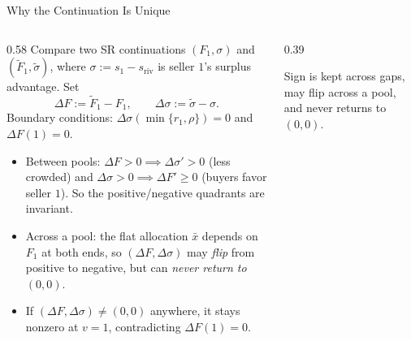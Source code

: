 \documentclass[11pt,aspectratio=169]{beamer}
\def\meditem{\smallskip\item}
\begin{document}
\begin{frame}{Why the Continuation Is Unique}
\begin{columns}[T]
\begin{column}{0.58\textwidth}
Compare two SR continuations $(F_1,\sigma)$ and $(\tilde F_1,\tilde\sigma)$, where $\sigma:=s_1-s_{\mathrm{riv}}$ is seller $1$'s surplus advantage. Set
\[
\Delta F := \tilde F_1 - F_1, \qquad \Delta\sigma := \tilde\sigma - \sigma.
\]
Boundary conditions: $\Delta\sigma(\min\{r_1,\rho\})=0$ and $\Delta F(1)=0$.
\begin{itemize}
\item \alert{Between pools}: $\Delta F>0 \implies \Delta\sigma'>0$ (less crowded) and $\Delta\sigma>0 \implies \Delta F'\ge 0$ (buyers favor seller $1$). So the positive/negative quadrants are invariant.
\meditem \alert{Across a pool}: the flat allocation $\bar x$ depends on $F_1$ at both ends, so $(\Delta F,\Delta\sigma)$ may \emph{flip} from positive to negative, but can \emph{never return to $(0,0)$}.
\meditem If $(\Delta F,\Delta\sigma)\neq(0,0)$ anywhere, it stays nonzero at $v=1$, contradicting $\Delta F(1)=0$.
\end{itemize}
\end{column}
\begin{column}{0.39\textwidth}
\centering{}

\medskip
{\scriptsize Sign is kept across gaps, may flip across a pool, and never returns to $(0,0)$.}
\end{column}
\end{columns}
\end{frame}
\end{document}
